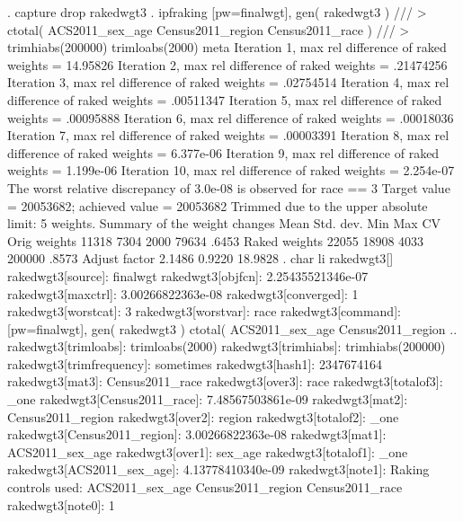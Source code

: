 . capture drop rakedwgt3
{\smallskip}
. ipfraking [pw=finalwgt], gen( rakedwgt3 ) ///
>     ctotal( ACS2011_sex_age Census2011_region Census2011_race ) ///
>     trimhiabs(200000) trimloabs(2000) meta
{\smallskip}
 Iteration 1, max rel difference of raked weights = 14.95826
 Iteration 2, max rel difference of raked weights = .21474256
 Iteration 3, max rel difference of raked weights = .02754514
 Iteration 4, max rel difference of raked weights = .00511347
 Iteration 5, max rel difference of raked weights = .00095888
 Iteration 6, max rel difference of raked weights = .00018036
 Iteration 7, max rel difference of raked weights = .00003391
 Iteration 8, max rel difference of raked weights = 6.377e-06
 Iteration 9, max rel difference of raked weights = 1.199e-06
 Iteration 10, max rel difference of raked weights = 2.254e-07
The worst relative discrepancy of  3.0e-08 is observed for race == 3           
Target value =   20053682; achieved value =   20053682
Trimmed due to the upper absolute limit: 5 weights.
{\smallskip}
   Summary of the weight changes
{\smallskip}
              {\VBAR}    Mean    Std. dev.    Min        Max       CV
Orig weights  {\VBAR}    11318       7304      2000       79634   .6453
Raked weights {\VBAR}    22055      18908      4033      200000   .8573
Adjust factor {\VBAR}   2.1486               0.9220     18.9828
{\smallskip}
. char li rakedwgt3[]
  rakedwgt3[source]:          finalwgt
  rakedwgt3[objfcn]:          2.25435521346e-07
  rakedwgt3[maxctrl]:         3.00266822363e-08
  rakedwgt3[converged]:       1
  rakedwgt3[worstcat]:        3
  rakedwgt3[worstvar]:        race
  rakedwgt3[command]:         [pw=finalwgt], gen( rakedwgt3 ) ctotal( ACS2011_sex_age Census2011_region ..
  rakedwgt3[trimloabs]:       trimloabs(2000)
  rakedwgt3[trimhiabs]:       trimhiabs(200000)
  rakedwgt3[trimfrequency]:   sometimes
  rakedwgt3[hash1]:           2347674164
  rakedwgt3[mat3]:            Census2011_race
  rakedwgt3[over3]:           race
  rakedwgt3[totalof3]:        _one
  rakedwgt3[Census2011_race]: 7.48567503861e-09
  rakedwgt3[mat2]:            Census2011_region
  rakedwgt3[over2]:           region
  rakedwgt3[totalof2]:        _one
  rakedwgt3[Census2011_region]:
                              3.00266822363e-08
  rakedwgt3[mat1]:            ACS2011_sex_age
  rakedwgt3[over1]:           sex_age
  rakedwgt3[totalof1]:        _one
  rakedwgt3[ACS2011_sex_age]: 4.13778410340e-09
  rakedwgt3[note1]:           Raking controls used: ACS2011_sex_age Census2011_region Census2011_race
  rakedwgt3[note0]:           1
{\smallskip}
